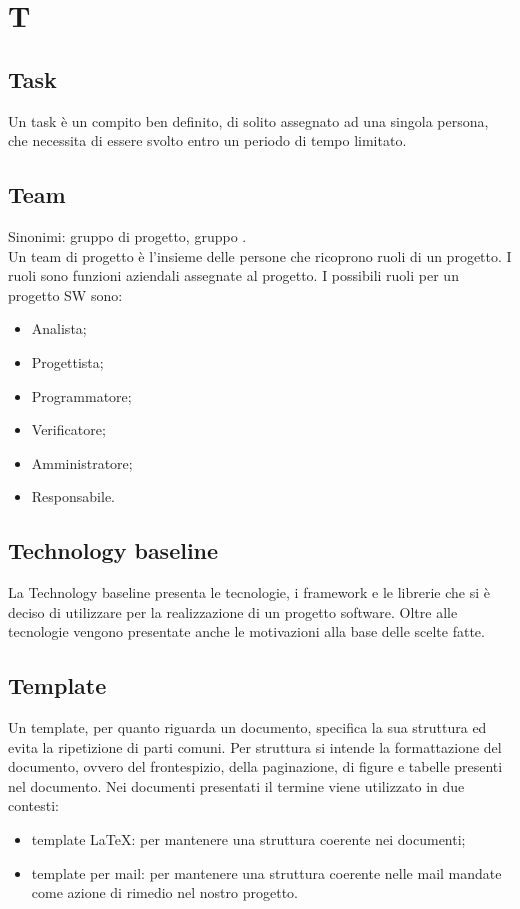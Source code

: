 \section{T}

	\subsection*{Task}
		Un task è un compito ben definito, di solito assegnato ad una singola persona, che necessita di essere svolto entro un periodo di tempo limitato.

    \subsection*{Team}

        Sinonimi: gruppo di progetto, gruppo \ProjectName. \\
        Un team di progetto è l'insieme delle persone che ricoprono ruoli di un progetto.
        I ruoli sono funzioni aziendali assegnate al progetto. I possibili ruoli per un progetto SW sono:

        \begin{itemize}
            \item Analista;
            \item Progettista;
            \item Programmatore;
            \item Verificatore;
            \item Amministratore;
            \item Responsabile.
        \end{itemize}

    \subsection*{Technology baseline}

        La Technology baseline presenta le tecnologie, i framework e le librerie che si è deciso di utilizzare
        per la realizzazione di un progetto software.
        Oltre alle tecnologie vengono presentate anche le motivazioni alla base delle scelte fatte.

    \subsection*{Template}

        Un template, per quanto riguarda un documento, specifica la sua struttura ed evita la ripetizione di parti comuni.
        Per struttura si intende la formattazione del documento, ovvero del frontespizio, della paginazione,
        di figure e tabelle presenti nel documento.
        Nei documenti presentati il termine viene utilizzato in due contesti:
	\begin{itemize}
		\item template \LaTeX{}: per mantenere una struttura coerente nei documenti;
		\item template per mail: per mantenere una struttura coerente nelle mail mandate come azione di rimedio nel nostro 			progetto.
	\end{itemize}

